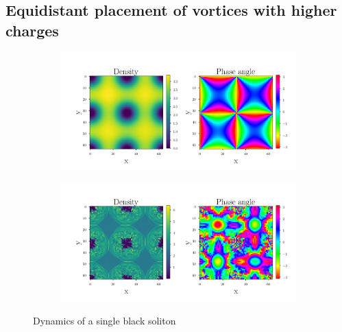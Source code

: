 \subsection{Equidistant placement of vortices with higher charges}
 \begin{figure}[H]
 \centering
 \begin{subfigure}{0.8\textwidth} 
 	\includegraphics[width= \textwidth]{figures/vortex_3_0}
 \end{subfigure}
 \begin{subfigure}{0.8\textwidth} 
 	\includegraphics[width= \textwidth]{figures/vortex_3_50}
 \end{subfigure}
 \caption{Dynamics of a single black soliton}	
 \end{figure}